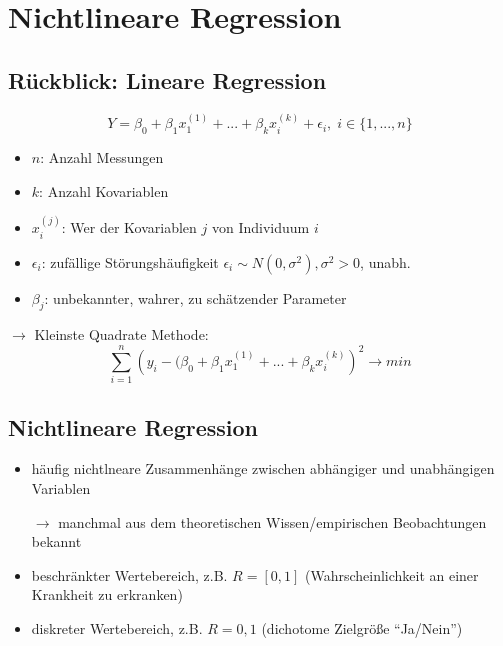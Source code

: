 \documentclass[../VorlesungMaster.tex]{subfiles}
\begin{document}
\section{Nichtlineare Regression}
\subsection{Rückblick: Lineare Regression}
\[ Y= \beta_0 + \beta_1 x_1^{(1)} + ... + \beta_k x_i^{(k)} + \epsilon_i, \; i \in \{1,...,n\} \]
\begin{itemize}
 \item $n$: Anzahl Messungen 
 \item $k$: Anzahl Kovariablen 
 \item $x_i^{(j)}$: Wer der Kovariablen $j$ von Individuum $i$
 \item $\epsilon_i$: zufällige Störungshäufigkeit $\epsilon_i \sim N(0, \sigma^2), \sigma^2 > 0$, unabh.
 \item $\beta_j$: unbekannter, wahrer, zu schätzender Parameter
\end{itemize}
$\rightarrow$ Kleinste Quadrate Methode:
\[ \sum\limits_{i=1}^n \left(y_i - (\beta_0 + \beta_1 x_1^{(1)} + ... + \beta_k x_i^{(k)} \right)^2 \rightarrow min \]

\subsection{Nichtlineare Regression}
\begin{itemize}
 \item häufig nichtlneare Zusammenhänge zwischen abhängiger und unabhängigen Variablen 
	\begin{sloppypar}
	 $\rightarrow$ manchmal aus dem theoretischen Wissen/empirischen Beobachtungen bekannt
	\end{sloppypar}
 \item beschränkter Wertebereich, z.B. $R=[0,1]$ (Wahrscheinlichkeit an einer Krankheit zu erkranken)
 \item diskreter Wertebereich, z.B. $R={0,1}$ (dichotome Zielgröße ``Ja/Nein'')
\end{itemize}

\end{document}
